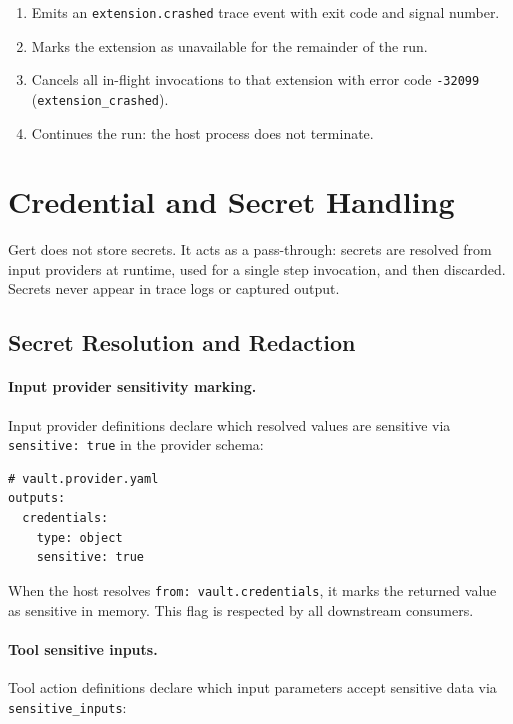 \begin{enumerate}
  \item Emits an \texttt{extension.crashed} trace event with exit code and
        signal number.
  \item Marks the extension as unavailable for the remainder of the run.
  \item Cancels all in-flight invocations to that extension with error code
        \texttt{-32099} (\texttt{extension\_crashed}).
  \item Continues the run: the host process does not terminate.
\end{enumerate}

\section{Credential and Secret Handling}
\label{sec:credential-handling}

Gert does not store secrets.  It acts as a pass-through: secrets are
resolved from input providers at runtime, used for a single step invocation,
and then discarded.  Secrets never appear in trace logs or captured output.

\subsection{Secret Resolution and Redaction}

\paragraph{Input provider sensitivity marking.}
Input provider definitions declare which resolved values are sensitive via
\texttt{sensitive: true} in the provider schema:

\begin{verbatim}
# vault.provider.yaml
outputs:
  credentials:
    type: object
    sensitive: true
\end{verbatim}

When the host resolves \texttt{from: vault.credentials}, it marks the returned
value as sensitive in memory.  This flag is respected by all downstream
consumers.

\paragraph{Tool sensitive inputs.}
Tool action definitions declare which input parameters accept sensitive data via
\texttt{sensitive\_inputs}:

